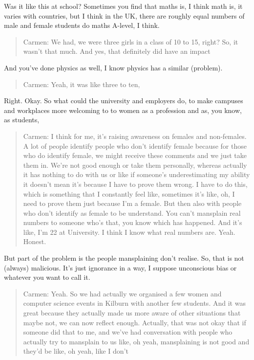 \documentclass[
]{book}
\begin{document}
Was it like this at school? Sometimes you find that maths is, I think math is, it varies with countries, but I think in the UK, there are roughly equal numbers of male and female students do maths A-level, I think.

\begin{quote}
Carmen: We had, we were three girls in a class of 10 to 15, right? So, it wasn't that much. And yes, that definitely did have an impact
\end{quote}

And you've done physics as well, I know physics has a similar (problem).

\begin{quote}
Carmen: Yeah, it was like three to ten,
\end{quote}

Right. Okay. So what could the university and employers do, to make campuses and workplaces more welcoming to to women as a profession and as, you know, as students,

\begin{quote}
Carmen: I think for me, it's raising awareness on females and non-females. A lot of people identify people who don't identify female because for those who do identify female, we might receive these comments and we just take them in. We're not good enough or take them personally, whereas actually it has nothing to do with us or like if someone's underestimating my ability it doesn't mean it's because I have to prove them wrong. I have to do this, which is something that I constantly feel like, sometimes it's like, oh, I need to prove them just because I'm a female. But then also with people who don't identify as female to be understand. You can't mansplain real numbers to someone who's that, you know which has happened. And it's like, I'm 22 at University. I think I know what real numbers are. Yeah. Honest.
\end{quote}

But part of the problem is the people mansplaining don't realise. So, that is not (always) malicious. It's just ignorance in a way, I suppose unconscious bias or whatever you want to call it.

\begin{quote}
Carmen: Yeah. So we had actually we organised a few women and computer science events in Kilburn with another few students. And it was great because they actually made us more aware of other situations that maybe not, we can now reflect enough. Actually, that was not okay that if someone did that to me, and we've had conversation with people who actually try to mansplain to us like, oh yeah, mansplaining is not good and they'd be like, oh yeah, like I don't
\end{quote}
\end{document}
